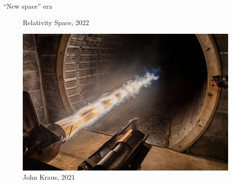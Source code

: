 \documentclass[]{beamer}
\begin{document}
\begin{frame}{``New space'' era}
\begin{minipage}{0.33\linewidth}
\begin{figure}
			\caption*{\tiny{Relativity Space, 2022}}
		\end{figure}
	\end{minipage}
	\begin{minipage}{0.28\linewidth}
		\begin{figure}
			\includegraphics[width=0.99\linewidth]{intro/delphin.jpeg}
			\caption*{\tiny{John Kraus, 2021}}
		\end{figure}
	\end{minipage}
\end{frame}
\end{document}
